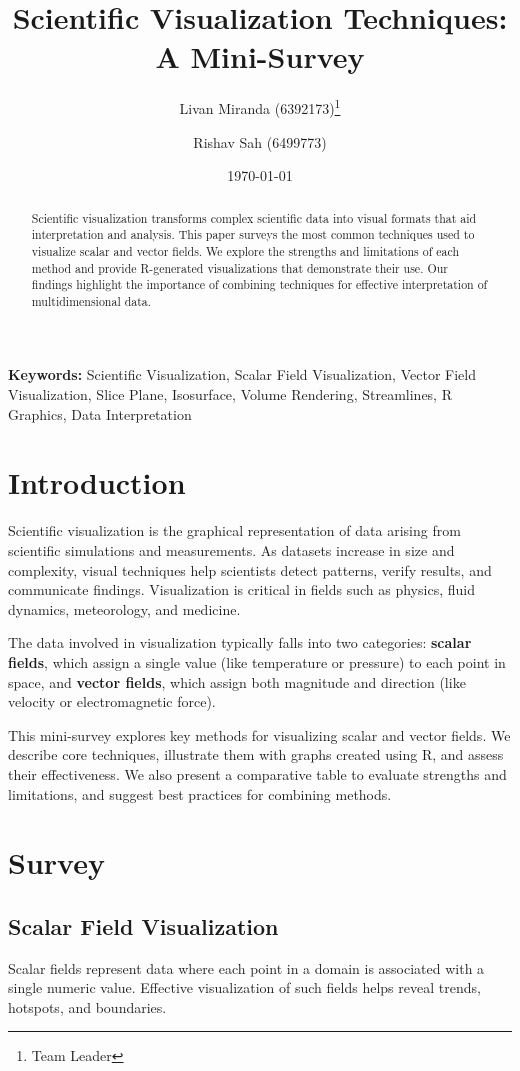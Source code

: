 \documentclass[11pt]{article}
\title{Scientific Visualization Techniques: A Mini-Survey}
\author{
	Livan Miranda (6392173)\thanks{Team Leader} \and
	Rishav Sah (6499773)
}
\date{\today}
\begin{document}
	
	\maketitle
	
	\begin{abstract}
		Scientific visualization transforms complex scientific data into visual formats that aid interpretation and analysis. This paper surveys the most common techniques used to visualize scalar and vector fields. We explore the strengths and limitations of each method and provide R-generated visualizations that demonstrate their use. Our findings highlight the importance of combining techniques for effective interpretation of multidimensional data.
	\end{abstract}
	
	\textbf{Keywords:} Scientific Visualization, Scalar Field Visualization, Vector Field Visualization, Slice Plane, Isosurface, Volume Rendering, Streamlines, R Graphics, Data Interpretation

	
	\section{Introduction}
	Scientific visualization is the graphical representation of data arising from scientific simulations and measurements. As datasets increase in size and complexity, visual techniques help scientists detect patterns, verify results, and communicate findings. Visualization is critical in fields such as physics, fluid dynamics, meteorology, and medicine.
	
	The data involved in visualization typically falls into two categories: \textbf{scalar fields}, which assign a single value (like temperature or pressure) to each point in space, and \textbf{vector fields}, which assign both magnitude and direction (like velocity or electromagnetic force).
	
	This mini-survey explores key methods for visualizing scalar and vector fields. We describe core techniques, illustrate them with graphs created using R, and assess their effectiveness. We also present a comparative table to evaluate strengths and limitations, and suggest best practices for combining methods.
	
	\section{Survey}
	
	\subsection{Scalar Field Visualization}
	Scalar fields represent data where each point in a domain is associated with a single numeric value. Effective visualization of such fields helps reveal trends, hotspots, and boundaries.
	
\end{document}
